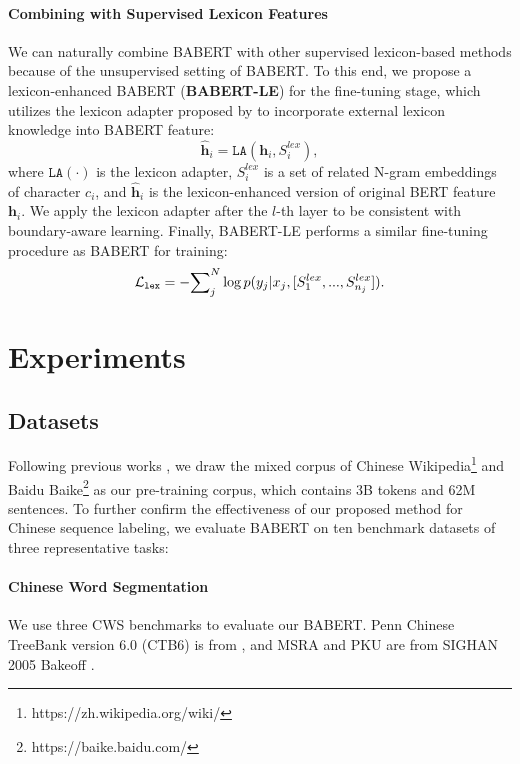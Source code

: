 \documentclass[11pt]{article}
\begin{document}
\begin{CJK}{UTF8}{gbsn}
\paragraph{Combining with Supervised Lexicon Features}
We can naturally combine BABERT with other supervised lexicon-based methods because of the unsupervised setting of BABERT.
To this end, we propose a lexicon-enhanced BABERT (\textbf{BABERT-LE}) for the fine-tuning stage,
which utilizes the lexicon adapter proposed by \citet{liu-etal-2021-lexicon} to incorporate external lexicon knowledge into BABERT feature:
\begin{equation}
  \mathbf{\hat{h}}_i = \texttt{LA}(\mathbf{h}_i, S_i^{lex}),
\end{equation}
where $\texttt{LA}(\cdot)$ is the lexicon adapter,
$S_i^{lex}$ is a set of related N-gram embeddings of character $c_i$,
and $\mathbf{\hat{h}}_i$ is the lexicon-enhanced version of original BERT feature $\mathbf{h}_i$.
We apply the lexicon adapter after the $l$-th layer to be consistent with boundary-aware learning.
Finally, BABERT-LE performs a similar fine-tuning procedure as BABERT for training:
\begin{equation}
  \label{eq:le_finetune}
  \small
  \mathcal{L}_\texttt{lex} = - {\sum}_j^N \log p(y_j| x_j, [S_1^{lex},...,S_{n_j}^{lex}]).
\end{equation}


\section{Experiments}



\subsection{Datasets}
Following previous works \cite{devlin2018bert, xiao-etal-2021-ernie},
we draw the mixed corpus of Chinese Wikipedia\footnote{https://zh.wikipedia.org/wiki/} and Baidu Baike\footnote{https://baike.baidu.com/} as our pre-training corpus, which contains 3B tokens and 62M sentences. To further confirm the effectiveness of our proposed method for Chinese sequence labeling,
we evaluate BABERT on ten benchmark datasets of three representative tasks:

\paragraph{Chinese Word Segmentation}
We use three CWS benchmarks to evaluate our BABERT.
Penn Chinese TreeBank version 6.0 (CTB6) is from \citet{xue2005penn},
and MSRA and PKU are from SIGHAN 2005 Bakeoff \cite{emerson-2005-second}.


\end{CJK}
\end{document}
